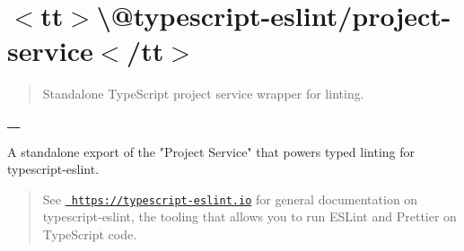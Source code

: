 \chapter{\texorpdfstring{$<$}{<}tt\texorpdfstring{$>$}{>}\textbackslash{}@typescript-\/eslint/project-\/service\texorpdfstring{$<$}{<}/tt\texorpdfstring{$>$}{>}}
\hypertarget{md__project5___h_r_2_project5___h_r___front___end_2node__modules_2_0dtypescript-eslint_2project-service_2_r_e_a_d_m_e}{}\label{md__project5___h_r_2_project5___h_r___front___end_2node__modules_2_0dtypescript-eslint_2project-service_2_r_e_a_d_m_e}
\label{md__project5___h_r_2_project5___h_r___front___end_2node__modules_2_0dtypescript-eslint_2project-service_2_r_e_a_d_m_e_autotoc_md472}%
%
 \begin{quote}
Standalone Type\+Script project service wrapper for linting. \end{quote}
\href{https://www.npmjs.com/package/@typescript-eslint/project-service}{\texttt{ }} \href{https://www.npmjs.com/package/@typescript-eslint/project-service}{\texttt{ }}

A standalone export of the "{}\+Project Service"{} that powers typed linting for typescript-\/eslint.

\begin{quote}
See \href{https://typescript-eslint.io}{\texttt{ https\+://typescript-\/eslint.\+io}} for general documentation on typescript-\/eslint, the tooling that allows you to run ESLint and Prettier on Type\+Script code. \end{quote}
